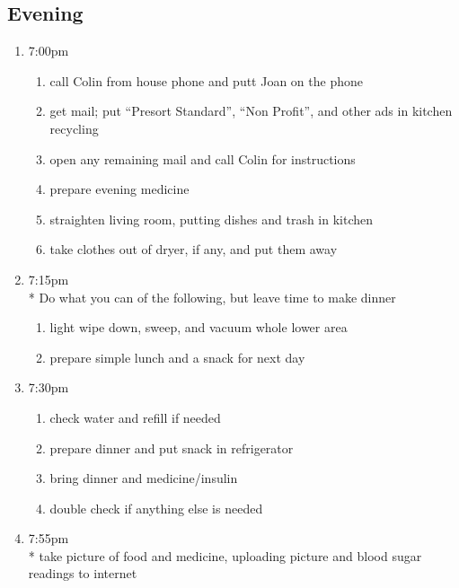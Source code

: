 \documentclass[12pt,letterpaper]{article}
\begin{document}
\begin{multicols}{2}
\subsection*{Evening}
\begin{enumerate}
	\item 7:00pm
		\begin{enumerate}
			\item call Colin from house phone and putt Joan on the phone
			\item get mail; put ``Presort Standard'', ``Non Profit'', and other ads in kitchen recycling
			\item open any remaining mail and call Colin for instructions
			\item prepare evening medicine
			\item straighten living room, putting dishes and trash in kitchen
			\item take clothes out of dryer, if any, and put them away
		\end{enumerate}
	\item 7:15pm \\*
		Do what you can of the following, but leave time to make dinner
		\begin{enumerate}
			\item light wipe down, sweep, and vacuum whole lower area
			\item prepare simple lunch and a snack for next day
		\end{enumerate}
	\item 7:30pm
		\begin{enumerate}
			\item check water and refill if needed
			\item prepare dinner and put snack in refrigerator
			\item bring dinner and medicine/insulin
			\item double check if anything else is needed
		\end{enumerate}
	\item 7:55pm \\*
		take picture of food and medicine, uploading picture and blood sugar readings to internet
\end{enumerate}
\end{multicols}
\end{document}
